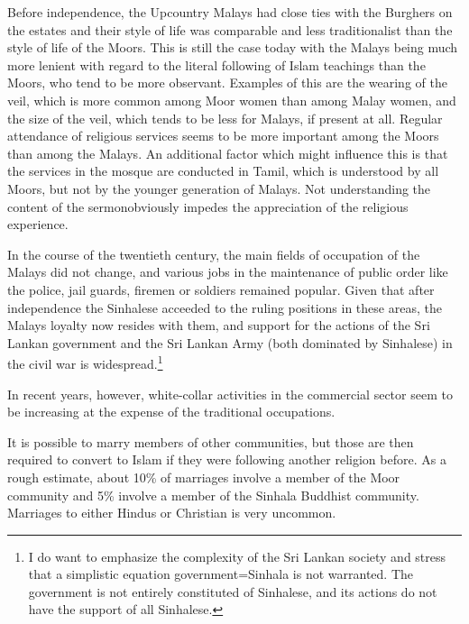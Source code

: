 Before independence, the Upcountry Malays had close ties with the Burghers on the estates and their style of life was comparable and less traditionalist than the style of life of the Moors. This is still the case today with the Malays being much more lenient with regard to the literal following of Islam teachings than the Moors, who tend to be more observant. Examples of this are the wearing of the veil, which is more common among Moor women than among Malay women, and the size of the veil, which tends to be less for Malays, if present at all. Regular attendance of religious services seems to be more important among the Moors than among the Malays. An additional factor which might influence this is that the services in the mosque are conducted in Tamil, which is understood by all Moors, but not by the younger generation of Malays. Not understanding the content of the sermon\kuckn obviously impedes the appreciation of the religious experience.

In the course of the twentieth century, the main fields of occupation of the Malays did not change, and various jobs in the maintenance of public order like the police, jail guards, firemen or soldiers remained popular. Given that after independence the Sinhalese acceeded to the ruling positions in these areas, the Malays loyalty now resides with them, and support for the actions of the Sri Lankan government and the Sri Lankan Army (both dominated by Sinhalese) in the civil war is widespread.\footnote{I do want to emphasize the complexity of the Sri Lankan society and stress that a simplistic equation government=Sinhala is not warranted. The government is not entirely constituted of Sinhalese, and its actions do not have the support of all Sinhalese.}

In recent years, however,  white-collar activities in the commercial sector seem to be increasing at the expense of the traditional occupations.

It is possible to marry members of other communities, but those are then required to convert to Islam if they were following another religion before. As a rough estimate, about 10\% of marriages involve a member of the Moor community and 5\% involve a member of the Sinhala Buddhist community. Marriages to either Hindus or Christian is very uncommon. 





